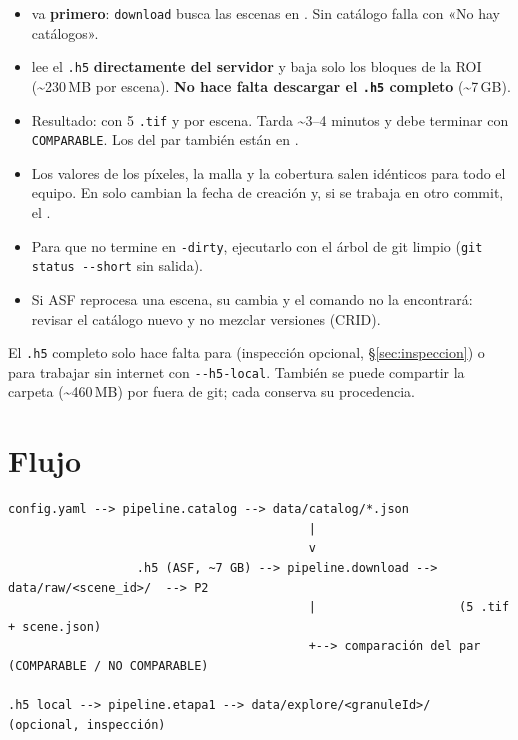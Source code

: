 \documentclass[11pt,a4paper]{article}
\begin{document}
\begin{itemize}
  \item {} va \textbf{primero}: \texttt{download} busca las escenas en . Sin catálogo falla con «No hay catálogos».
  \item {} lee el \texttt{.h5} \textbf{directamente del servidor} y baja solo los bloques de la ROI
        (\textasciitilde 230\,MB por escena). \textbf{No hace falta descargar el \texttt{.h5} completo} (\textasciitilde 7\,GB).
  \item Resultado:  con 5 \texttt{.tif} y  por escena. Tarda \textasciitilde 3--4 minutos y debe
        terminar con \texttt{COMPARABLE}. Los  del par también están en .
  \item Los valores de los píxeles, la malla y la cobertura salen idénticos para todo el equipo. En  solo cambian la
        fecha de creación y, si se trabaja en otro commit, el .
  \item Para que  no termine en \texttt{-dirty}, ejecutarlo con el árbol de git limpio (\texttt{git status -{}-short} sin salida).
  \item Si ASF reprocesa una escena, su  cambia y el comando no la encontrará: revisar el catálogo nuevo y no mezclar versiones (CRID).
\end{itemize}

El \texttt{.h5} completo solo hace falta para  (inspección opcional, §\ref{sec:inspeccion}) o para trabajar sin
internet con \texttt{-{}-h5-local}. También se puede compartir la carpeta  (\textasciitilde 460\,MB) por fuera de git; cada
 conserva su procedencia.

\section{Flujo}

\begin{lstlisting}
config.yaml --> pipeline.catalog --> data/catalog/*.json
                                          |
                                          v
                  .h5 (ASF, ~7 GB) --> pipeline.download --> data/raw/<scene_id>/  --> P2
                                          |                    (5 .tif + scene.json)
                                          +--> comparación del par (COMPARABLE / NO COMPARABLE)

.h5 local --> pipeline.etapa1 --> data/explore/<granuleId>/   (opcional, inspección)
\end{lstlisting}
\end{document}
